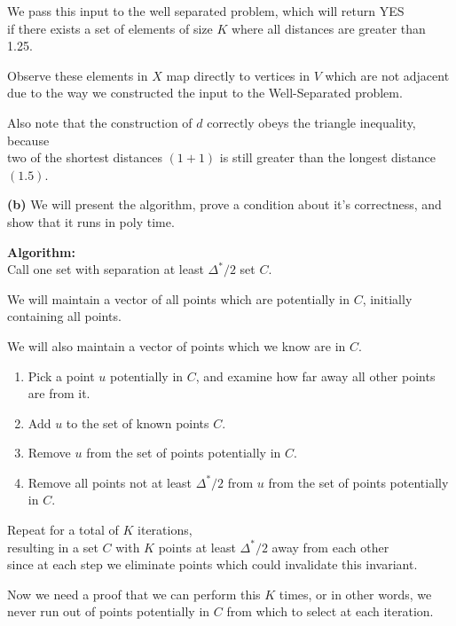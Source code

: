 \documentclass[11pt]{article}
\renewcommand{\part}[1] {\vspace{.10in} {\bf (#1)}}
\begin{document}
We pass this input to the well separated problem, which will return YES\\
if there exists a set of elements of size $K$ where all distances are greater than 1.25.

Observe these elements in $X$ map directly to vertices in $V$ which are not adjacent\\
due to the way we constructed the input to the Well-Separated problem.

Also note that the construction of $d$ correctly obeys the triangle inequality, because\\
two of the shortest distances $(1 + 1)$ is still greater than the longest distance $(1.5)$.


\part{b}
We will present the algorithm, prove a condition about it's correctness, and show that it runs in poly time.

\textbf{Algorithm:}\\
Call one set with separation at least $\Delta^{*} / 2$ set $C$.

We will maintain a vector of all points which are potentially in $C$, initially containing all points.

We will also maintain a vector of points which we know are in $C$.

\begin{enumerate}
\item Pick a point $u$ potentially in $C$, and examine how far away all other points are from it.
\item Add $u$ to the set of known points $C$.
\item Remove $u$ from the set of points potentially in $C$.
\item Remove all points not at least $\Delta^{*} / 2$ from $u$ from the set of points potentially in $C$.
\end{enumerate}

Repeat for a total of $K$ iterations,\\
resulting in a set $C$ with $K$ points at least $\Delta^{*} / 2$ away from each other\\
since at each step we eliminate points which could invalidate this invariant.

Now we need a proof that we can perform this $K$ times, or in other words, we never run out of points potentially in $C$ from which to select at each iteration.
\end{document}
